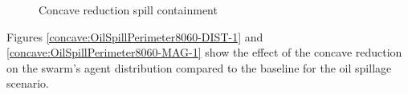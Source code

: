 \begin{figure}[H]
\centering
{}
\caption{Concave reduction spill containment}
\label{fig:OilSpillConcaveReduction}
\end{figure}

Figures \ref{concave:OilSpillPerimeter8060-DIST-1} and \ref{concave:OilSpillPerimeter8060-MAG-1} show the effect of the concave reduction on the swarm's agent distribution compared to the baseline for the oil spillage scenario. 

